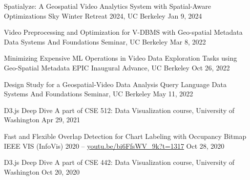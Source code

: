 

\begin{cvpubs}

  \cvpub
    {Spatialyze: A Geospatial Video Analytics System with Spatial-Aware Optimizations} %
    {Sky Winter Retreat 2024, UC Berkeley} %
    {Jan 9, 2024} %
    {} %

  \cvpub
    {Video Preprocessing and Optimization for V-DBMS with Geo-spatial Metadata} %
    {Data Systems And Foundations Seminar, UC Berkeley} %
    {Mar 8, 2022} %
    {} %

  \cvpub
    {Minimizing Expensive ML Operations in Video Data Exploration Tasks using Geo-Spatial Metadata} %
    {EPIC Inaugural Advance, UC Berkeley} %
    {Oct 26, 2022} %
    {} %

  \cvpub
    {Design Study for a Geospatial-Video Data Analysis Query Language} %
    {Data Systems And Foundations Seminar, UC Berkeley} %
    {May 11, 2022} %
    {} %

  \cvpub
    {D3.js Deep Dive} %
    {A part of CSE 512: Data Visualization course, University of Washington} %
    {Apr 29, 2021} %
    {} %
    
  \cvpub
    {Fast and Flexible Overlap Detection for Chart Labeling with Occupancy Bitmap} %
    {IEEE VIS (InfoVis) 2020  --  \href{https://youtu.be/bi6FfsWV_9k?t=1317}{youtu.be/bi6FfsWV\_9k?t=1317}} %
    {Oct 28, 2020} %
    {} %

  \cvpub
    {D3.js Deep Dive} %
    {A part of CSE 442: Data Visualization course, University of Washington} %
    {Oct 20, 2020} %
    {} %
\end{cvpubs}

